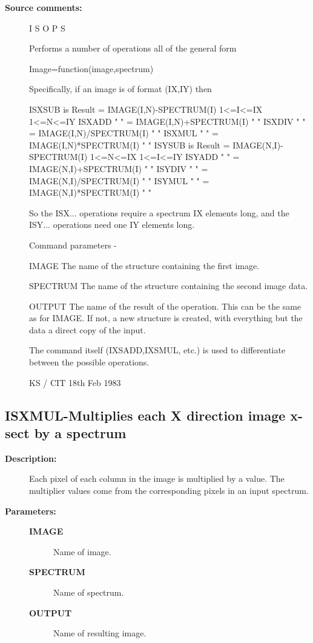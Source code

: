 \begin{description}
\begin{description}
\item [\textbf{Source comments:}]
\begin{terminalv}
 I S O P S

 Performs a number of operations all of the general form

 Image=function(image,spectrum)

 Specifically, if an image is of format (IX,IY) then

 ISXSUB is Result = IMAGE(I,N)-SPECTRUM(I) 1<=I<=IX 1<=N<=IY
 ISXADD  "   "    = IMAGE(I,N)+SPECTRUM(I)    "        "
 ISXDIV  "   "    = IMAGE(I,N)/SPECTRUM(I)    "        "
 ISXMUL  "   "    = IMAGE(I,N)*SPECTRUM(I)    "        "
 ISYSUB is Result = IMAGE(N,I)-SPECTRUM(I) 1<=N<=IX 1<=I<=IY
 ISYADD  "   "    = IMAGE(N,I)+SPECTRUM(I)    "        "
 ISYDIV  "   "    = IMAGE(N,I)/SPECTRUM(I)    "        "
 ISYMUL  "   "    = IMAGE(N,I)*SPECTRUM(I)    "        "

 So the ISX... operations require a spectrum IX elements long,
 and the ISY... operations need one IY elements long.

 Command parameters -

 IMAGE    The name of the structure containing the first image.

 SPECTRUM The name of the structure containing the second
          image data.

 OUTPUT   The name of the result of the operation.  This can
          be the same as for IMAGE.  If not, a new structure
          is created, with everything but the data a direct
          copy of the input.

 The command itself (IXSADD,IXSMUL, etc.) is used to
 differentiate between the possible operations.

                                  KS / CIT 18th Feb 1983
\end{terminalv}
\end{description}
\subsection{ISXMUL-\label{ISXMUL}Multiplies each X direction image x-sect by a spectrum}
\begin{description}

\item [\textbf{Description:}]
 Each pixel of each column in the image is multiplied by a value.
 The multiplier values come from the corresponding pixels in an
 input spectrum.

\item [\textbf{Parameters:}]
\begin{description}
\item [\textbf{IMAGE}]
 Name of image.
\item [\textbf{SPECTRUM}]
 Name of spectrum.
\item [\textbf{OUTPUT}]
 Name of resulting image.
\end{description}


\end{description}
\end{description}
